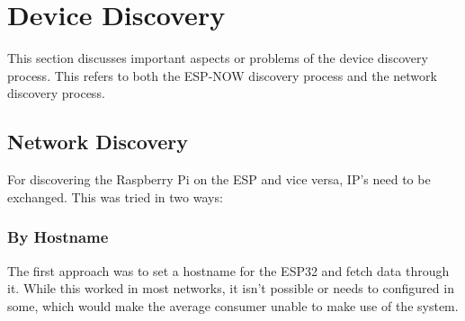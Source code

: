 \section{Device Discovery}
This section discusses important aspects or problems of the device discovery process.
This refers to both the ESP-NOW discovery process and the network discovery process.


    \subsection{Network Discovery} \label{sec:network_discovery}
    For discovering the Raspberry Pi on the ESP and vice versa,
    IP's need to be exchanged. This was tried in two ways:
        \subsubsection{By Hostname}
        The first approach was to set a hostname for the 
        ESP32 and fetch data through it. While this worked
        in most networks, it isn't possible or needs to 
        configured in some, which would make the average 
        consumer unable to make use of the system.

